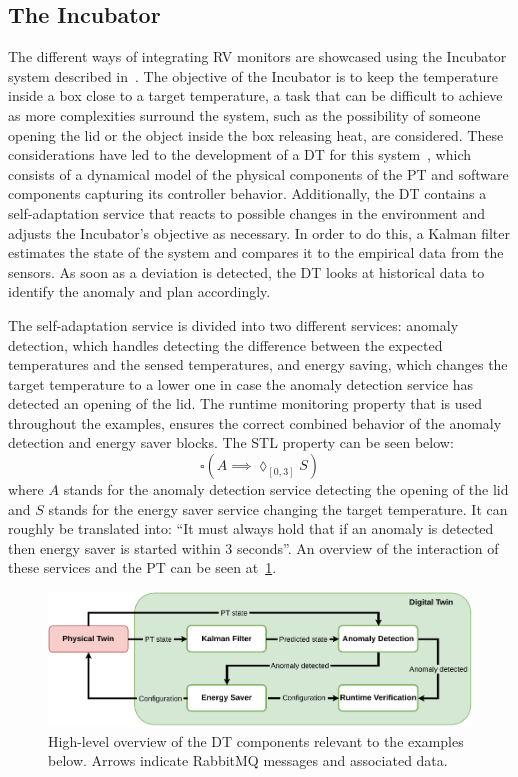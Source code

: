 \subsection{The Incubator}
The different ways of integrating RV monitors are showcased using the Incubator system described in~\cite{Feng&21c}.
The objective of the Incubator is to keep the temperature inside a box close to a target temperature, a task that can be difficult to achieve as more complexities surround the system, such as the possibility of someone opening the lid or the object inside the box releasing heat, are considered.
These considerations have led to the development of a DT for this system~\cite{Feng2022}, which consists of a dynamical model of the physical components of the PT and software components capturing its controller behavior. Additionally, the DT contains a self-adaptation service that reacts to possible changes in the environment and adjusts the Incubator's objective as necessary. In order to do this, a Kalman filter estimates the state of the system and compares it to the empirical data from the sensors. As soon as a deviation is detected, the DT looks at historical data to identify the anomaly and plan accordingly.

The self-adaptation service is divided into two different services: anomaly detection, which handles detecting the difference between the expected temperatures and the sensed temperatures, and energy saving, which changes the target temperature to a lower one in case the anomaly detection service has detected an opening of the lid.
The runtime monitoring property that is used throughout the examples, ensures the correct combined behavior of the anomaly detection and energy saver blocks.
The STL property can be seen below:
\begin{equation}
	\square(A\implies \lozenge_{[0,3]} S)
\end{equation}
where $A$ stands for the anomaly detection service detecting the opening of the lid and $S$ stands for the energy saver service changing the target temperature.
It can roughly be translated into: ``It must always hold that if an anomaly is detected then energy saver is started within 3 seconds''.
An overview of the interaction of these services and the PT can be seen at~\cref{fig:incubator}.

\begin{figure}[ht]
	\centering
	\includegraphics[width=\columnwidth]{images/incubator_anomaly_HL.pdf}
	\caption{High-level overview of the DT components relevant to the examples below. Arrows indicate RabbitMQ messages and associated data.}
	\label{fig:incubator}
\end{figure}
